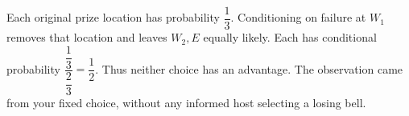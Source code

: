 Each original prize location has probability $\dfrac{1}{3}$. Conditioning on failure at $W_1$ removes that location and leaves $W_2,E$ equally likely. Each has conditional probability $\dfrac{\dfrac{1}{3}}{\dfrac{2}{3}}=\boxed{\dfrac{1}{2}}$. Thus neither choice has an advantage. The observation came from your fixed choice, without any informed host selecting a losing bell.
